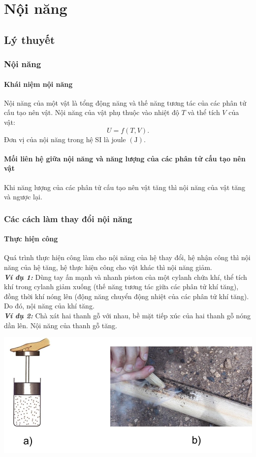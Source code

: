 \let\lesson\undefined
\newcommand{\lesson}{\phantomlesson{Bài 3: Nội năng. Định luật 1 nhiệt động lực học}}
\chapter[Nội năng]{Nội năng}
\section{Lý thuyết}
\subsection{Nội năng}
\subsubsection{Khái niệm nội năng}
Nội năng của một vật là tổng động năng và thế năng tương tác của các phân tử cấu tạo nên vật. Nội năng của vật phụ thuộc vào nhiệt độ $T$ và thể tích $V$ của vật:
$$U=f\left(T, V\right).$$
Đơn vị của nội năng trong hệ SI là joule $\left(\si{\joule}\right)$.
\subsubsection{Mối liên hệ giữa nội năng và năng lượng của các phân tử cấu tạo nên vật}
Khi năng lượng của các phân tử cấu tạo nên vật tăng thì nội năng của vật tăng và ngược lại.
\subsection{Các cách làm thay đổi nội năng}
\subsubsection{Thực hiện công}
Quá trình thực hiện công làm cho nội năng của hệ thay đổi, hệ nhận công thì nội năng của hệ tăng, hệ thực hiện công cho vật khác thì nội năng giảm.\\
\textbf{\textit{Ví dụ 1:}} Dùng tay ấn mạnh và nhanh piston của một cylanh chứa khí, thể tích khí trong cylanh giảm xuống (thế năng tương tác giữa các phân tử khí tăng), đồng thời khí nóng lên (động năng chuyển động nhiệt của các phân tử khí tăng). Do đó, nội năng của khí tăng.\\
\textbf{\textit{Ví dụ 2:}} Chà xát hai thanh gỗ với nhau, bề mặt tiếp xúc của hai thanh gỗ nóng dần lên. Nội năng của thanh gỗ tăng.
\begin{center}
	\includegraphics[width=0.45\linewidth	]{../figs/VN12-Y24-PH-SYL-003-1}
\end{center}
